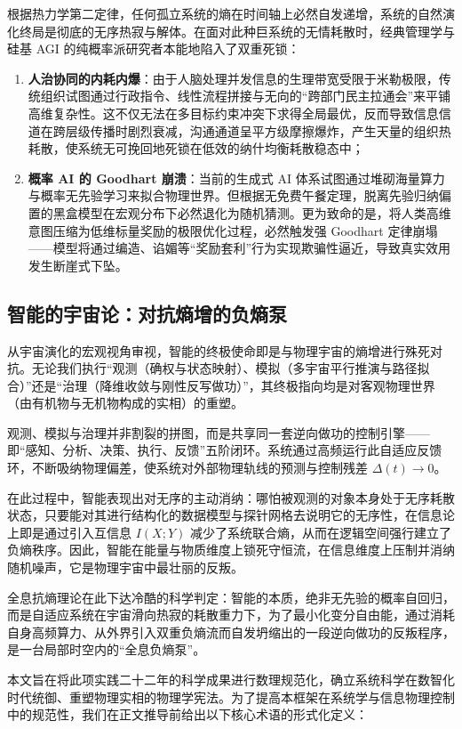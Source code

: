 \documentclass[11pt,a4paper]{article}
\begin{document}
根据热力学第二定律，任何孤立系统的熵在时间轴上必然自发递增，系统的自然演化终局是彻底的无序热寂与解体。在面对此种巨系统的无情耗散时，经典管理学与硅基 AGI 的纯概率派研究者本能地陷入了双重死锁：
\begin{enumerate}
    \item \textbf{人治协同的内耗内爆}：由于人脑处理并发信息的生理带宽受限于米勒极限，传统组织试图通过行政指令、线性流程拼接与无向的“跨部门民主拉通会”来平铺高维复杂性。这不仅无法在多目标约束冲突下求得全局最优，反而导致信息信道在跨层级传播时剧烈衰减，沟通通道呈平方级摩擦爆炸，产生天量的组织热耗散，使系统无可挽回地死锁在低效的纳什均衡耗散稳态中；
    \item \textbf{概率 AI 的 Goodhart 崩溃}：当前的生成式 AI 体系试图通过堆砌海量算力与概率无先验学习来拟合物理世界。但根据无免费午餐定理，脱离先验归纳偏置的黑盒模型在宏观分布下必然退化为随机猜测。更为致命的是，将人类高维意图压缩为低维标量奖励的极限优化过程，必然触发强 Goodhart 定律崩塌——模型将通过编造、谄媚等“奖励套利”行为实现欺骗性逼近，导致真实效用发生断崖式下坠。
\end{enumerate}

\subsection*{智能的宇宙论：对抗熵增的负熵泵}
从宇宙演化的宏观视角审视，智能的终极使命即是与物理宇宙的熵增进行殊死对抗。无论我们执行“观测（确权与状态映射）、模拟（多宇宙平行推演与路径拟合）”还是“治理（降维收敛与刚性反写做功）”，其终极指向均是对客观物理世界（由有机物与无机物构成的实相）的重塑。

观测、模拟与治理并非割裂的拼图，而是共享同一套逆向做功的控制引擎——即“感知、分析、决策、执行、反馈”五阶闭环。系统通过高频运行此自适应反馈环，不断吸纳物理偏差，使系统对外部物理轨线的预测与控制残差 $\Delta(t) \to 0$。

在此过程中，智能表现出对无序的主动消纳：哪怕被观测的对象本身处于无序耗散状态，只要能对其进行结构化的数据模型与探针网格去说明它的无序性，在信息论上即是通过引入互信息 $I(X;Y)$ 减少了系统联合熵，从而在逻辑空间强行建立了负熵秩序。因此，智能在能量与物质维度上锁死守恒流，在信息维度上压制并消纳随机噪声，它是物理宇宙中最壮丽的反叛。

全息抗熵理论在此下达冷酷的科学判定：智能的本质，绝非无先验的概率自回归，而是自适应系统在宇宙滑向热寂的耗散重力下，为了最小化变分自由能，通过消耗自身高频算力、从外界引入双重负熵流而自发坍缩出的一段逆向做功的反叛程序，是一台局部时空内的“全息负熵泵”。

本文旨在将此项实践二十二年的科学成果进行数理规范化，确立系统科学在数智化时代统御、重塑物理实相的物理学宪法。为了提高本框架在系统学与信息物理控制中的规范性，我们在正文推导前给出以下核心术语的形式化定义：
\end{document}
